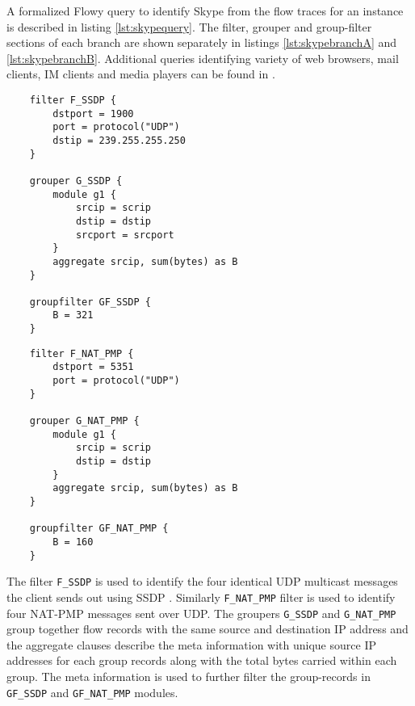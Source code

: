 A formalized Flowy query to identify Skype from the flow traces for an instance is described in listing \ref{lst:skypequery}. The filter, grouper and group-filter sections of each branch are shown separately in listings \ref{lst:skypebranchA} and \ref{lst:skypebranchB}. Additional queries identifying variety of web browsers, mail clients, IM clients and media players can be found in \cite{vperelman:thesis:2010}.

\begin{center}
\begin{minipage}{.44\textwidth}
	\begin{lstlisting}
	filter F_SSDP {
		dstport = 1900
		port = protocol("UDP")	
		dstip = 239.255.255.250
	}

	grouper G_SSDP {
		module g1 {
			srcip = scrip
			dstip = dstip
			srcport = srcport
		}
		aggregate srcip, sum(bytes) as B
	}

	groupfilter GF_SSDP {
		B = 321
	}
	\end{lstlisting}
\end{minipage}
\hfill
\begin{minipage}{.44\textwidth}
	\begin{lstlisting}
	filter F_NAT_PMP {
		dstport = 5351
		port = protocol("UDP")	
	}

	grouper G_NAT_PMP {
		module g1 {
			srcip = scrip
			dstip = dstip
		}
		aggregate srcip, sum(bytes) as B
	}

	groupfilter GF_NAT_PMP {
		B = 160
	}
	\end{lstlisting}
\end{minipage}
\end{center}

The filter \texttt{F\_SSDP} is used to identify the four identical \ac{UDP} multicast messages the client sends out using \ac{SSDP} \cite{mbodlaender:2005}. Similarly \texttt{F\_NAT\_PMP} filter is used to identify four \ac{NAT-PMP} \cite{draft-cheshire-nat-pmp-03} messages sent over UDP. The groupers \texttt{G\_SSDP} and \texttt{G\_NAT\_PMP} group together flow records with the same source and destination IP address and the aggregate clauses describe the meta information with unique source IP addresses for each group records along with the total bytes carried within each group. The meta information is used to further filter the group-records in \texttt{GF\_SSDP} and \texttt{GF\_NAT\_PMP} modules. 

